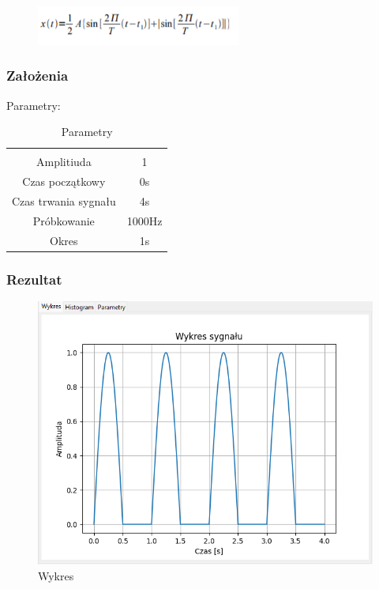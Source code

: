 \documentclass{article}
\begin{document}
\begin{figure}[!htbp]
    \centering
    \includegraphics[width=0.6\textwidth]{img/sinusjedno.png}
\end{figure}
\subsubsection{Założenia}
\noindent
Parametry:
\begin{table}[h!]
    \centering
    \vspace{0.2cm}
    \begin{tabular}{|c|c|}
        \hline\hline\\[-0.4cm]
        Amplitiuda & 1  \\
        \hline
        Czas początkowy & 0s  \\
        \hline
        Czas trwania sygnału & 4s  \\
        \hline
        Próbkowanie & 1000Hz \\
        \hline
        Okres & 1s\\
        \hline
    \end{tabular}
    \caption{Parametry}
    \label{sinusjednopolowkowy}
\end{table}
\subsubsection{Rezultat}
\begin{figure}[h!]
    \centering
    \includegraphics[width=\textwidth]{img/sinus-jedno/wykres.png}
    \caption{Wykres}
\end{figure}
\end{document}
